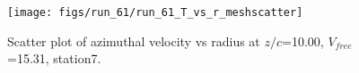 \begin{figure}[H]
\centering
\texttt{[image: figs/run\_61/run\_61\_T\_vs\_r\_meshscatter]}
\caption{Scatter plot of azimuthal velocity vs radius at $z/c$=10.00, $V_{free}$=15.31, station7.}
\end{figure}


